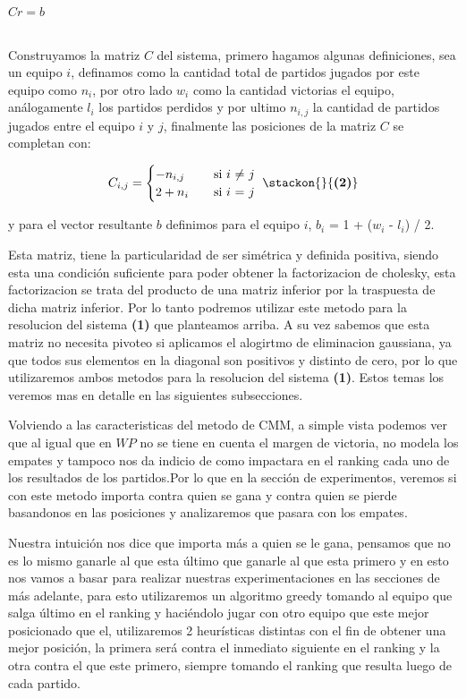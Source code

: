 \hfill $Cr=b$ \hfill {}

\\
Construyamos la matriz $C$ del sistema, primero hagamos algunas definiciones, sea un equipo $i$, definamos como la cantidad total de partidos jugados por este equipo como $n_i$, por otro lado $w_i$ como la cantidad victorias el equipo, análogamente $l_i$ los partidos perdidos y por ultimo $n_{i,j}$ la cantidad de partidos jugados entre el equipo $i$ y $j$, finalmente las posiciones de la matriz $C$ se completan con: 

\[ C_{i,j} =
    \begin{cases}
        -n_{i,j}       & \quad \text{si }  \text{$i$ $\neq$ $j$} \\
        2+n_i & \quad \text{si } \text{$i$ $=$ $j$ }\\
    \end{cases}\hfill \stackon{}{\textbf{(2)}}
$$
  $$  \]
                    
y para el vector resultante $b$ definimos para el equipo $i$, $b_i$ = 1 +  ($w_i$ - $l_i$) / 2.

Esta matriz, tiene la particularidad de ser simétrica y definida positiva, siendo esta una condición suficiente para poder obtener la factorizacion de cholesky, esta factorizacion se trata del producto de una matriz inferior por la traspuesta de dicha matriz inferior. Por lo tanto podremos utilizar este metodo para la resolucion del sistema \textbf{(1)} que planteamos arriba. A su vez sabemos que esta matriz no necesita pivoteo si aplicamos el alogirtmo de eliminacion gaussiana, ya que todos sus elementos en la diagonal son positivos y distinto de cero, por lo que utilizaremos ambos metodos para la resolucion del sistema \textbf{(1)}. Estos temas los veremos mas en detalle en las siguientes subsecciones.
    
Volviendo a las caracteristicas del metodo de CMM, a simple vista podemos ver que al igual que en $WP$ no se tiene en cuenta el margen de victoria, no modela los empates y tampoco nos da indicio de como impactara en el ranking cada uno de los resultados de los partidos.Por lo que en la sección de experimentos, veremos si con este metodo importa contra quien se gana y contra quien se pierde basandonos en las posiciones y analizaremos que pasara con los empates.

Nuestra intuición nos dice que importa más a quien se le gana, pensamos que no es lo mismo ganarle al que esta último que ganarle al que esta primero y en esto nos vamos a basar para realizar nuestras experimentaciones en las secciones de más adelante, para esto utilizaremos un algoritmo greedy tomando al equipo que salga último en el ranking y haciéndolo jugar con otro equipo que este mejor posicionado que el, utilizaremos 2 heurísticas distintas con el fin de obtener una mejor posición, la primera será contra el inmediato siguiente en el ranking y la otra contra el que este primero, siempre tomando el ranking que resulta luego de cada partido.


